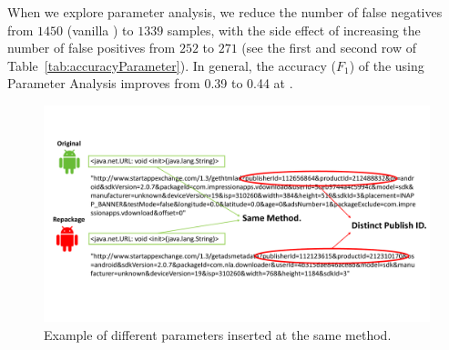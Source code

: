 When we explore parameter analysis, we reduce the number of false negatives from $1450$ (vanilla \mas) to $1339$ samples, with the side effect of increasing the number of false positives from $252$ to $271$ (see the first and second row of Table~\ref{tab:accuracyParameter}).
In general, the accuracy ($F_1$) of the \mas using Parameter Analysis improves from 0.39 to 0.44 at \cds.



\begin{figure}[t]
\centering
\includegraphics[scale=0.3]{images/parameterDiff.pdf}
\caption{Example of different parameters inserted at the same method.}
 \label{fig:parameterDiff}
\end{figure}

\begin{table}[ht]
  \caption{Accuracy of the \mas with aid of complementary techniques (3,211 app pairs).}
  \label{tab:accuracyParameter}
\end{table}

